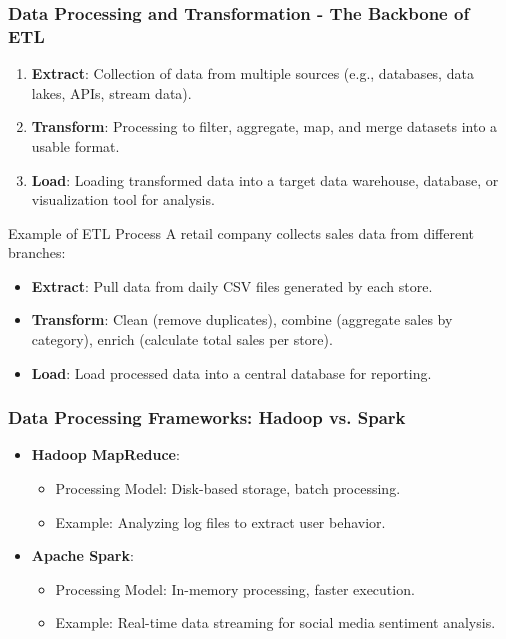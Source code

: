 \documentclass{beamer}
\begin{document}
\begin{frame}[fragile]
    \frametitle{Data Processing and Transformation - The Backbone of ETL}
    \begin{enumerate}
        \item \textbf{Extract}: Collection of data from multiple sources (e.g., databases, data lakes, APIs, stream data).
        \item \textbf{Transform}: Processing to filter, aggregate, map, and merge datasets into a usable format.
        \item \textbf{Load}: Loading transformed data into a target data warehouse, database, or visualization tool for analysis.
    \end{enumerate}

    \begin{block}{Example of ETL Process}
        A retail company collects sales data from different branches: 
        \begin{itemize}
            \item \textbf{Extract}: Pull data from daily CSV files generated by each store.
            \item \textbf{Transform}: Clean (remove duplicates), combine (aggregate sales by category), enrich (calculate total sales per store).
            \item \textbf{Load}: Load processed data into a central database for reporting.
        \end{itemize}
    \end{block}
\end{frame}

\begin{frame}[fragile]
    \frametitle{Data Processing Frameworks: Hadoop vs. Spark}
    \begin{itemize}
        \item \textbf{Hadoop MapReduce}:
            \begin{itemize}
                \item Processing Model: Disk-based storage, batch processing.
                \item Example: Analyzing log files to extract user behavior.
            \end{itemize}
        \item \textbf{Apache Spark}:
            \begin{itemize}
                \item Processing Model: In-memory processing, faster execution.
                \item Example: Real-time data streaming for social media sentiment analysis.
            \end{itemize}
    \end{itemize}
\end{frame}
\end{document}
